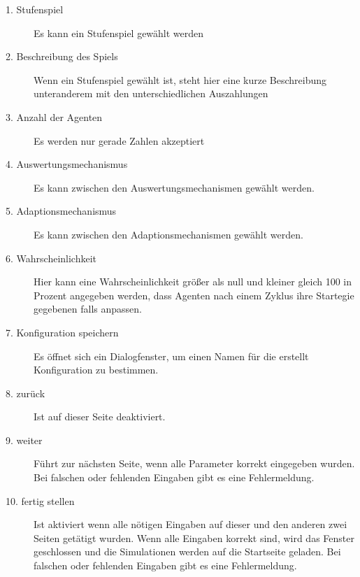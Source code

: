 \begin{description}

\item[1. Stufenspiel] Es kann ein Stufenspiel gewählt werden

\item[2. Beschreibung des Spiels] Wenn ein Stufenspiel gewählt ist, steht hier eine kurze Beschreibung unteranderem mit den unterschiedlichen Auszahlungen

\item[3. Anzahl der Agenten] Es werden nur gerade Zahlen akzeptiert

\item[4. Auswertungsmechanismus] Es kann zwischen den Auswertungsmechanismen gewählt werden.

\item[5. Adaptionsmechanismus] Es kann zwischen den Adaptionsmechanismen gewählt werden.

\item[6. Wahrscheinlichkeit] Hier kann eine Wahrscheinlichkeit größer als null und kleiner gleich 100 in Prozent angegeben werden, dass Agenten nach einem Zyklus ihre Startegie gegebenen falls anpassen.

\item[7. Konfiguration speichern] Es öffnet sich ein Dialogfenster, um einen Namen für die erstellt Konfiguration zu bestimmen.

\item[8. zurück] Ist auf dieser Seite deaktiviert.

\item[9. weiter] Führt zur nächsten Seite, wenn alle Parameter korrekt eingegeben wurden. Bei falschen oder fehlenden Eingaben gibt es eine Fehlermeldung.

\item[10. fertig stellen] Ist aktiviert wenn alle nötigen Eingaben auf dieser und den anderen zwei Seiten getätigt wurden. Wenn alle Eingaben korrekt sind, wird das Fenster geschlossen und die Simulationen werden auf die Startseite geladen. Bei falschen oder fehlenden Eingaben gibt es eine Fehlermeldung.

\end{description}

\pagebreak

